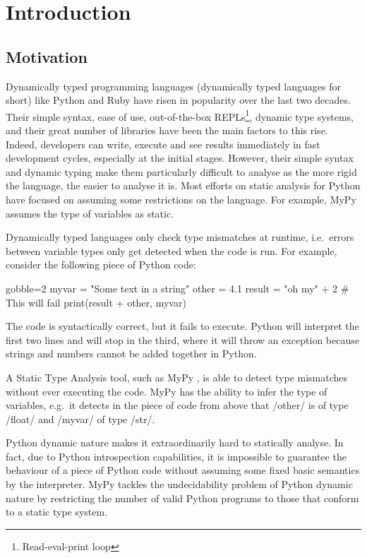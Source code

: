 \chapter{Introduction}\label{introduction}

\section{Motivation}\label{motivation}

Dynamically typed programming languages (dynamically typed languages for short) like
Python and Ruby have risen in popularity over the last two decades. Their simple syntax,
ease of use, out-of-the-box REPLs\footnote{Read-eval-print loop}, dynamic type systems,
and their great number of libraries have been the main factors to this rise. Indeed,
developers can  write, execute and see results immediately in fast development cycles,
especially at the initial stages. However, their simple syntax and dynamic typing make
them particularly difficult to analyse as the more rigid the language, the easier to
analyse it is. Most efforts on static analysis for Python have focused on assuming some
restrictions on the language. For example, MyPy \autocite{lehtosalo2016mypy} assumes the
type of variables as static.

Dynamically typed languages only check type mismatches at runtime, i.e.~errors between
variable types only get detected when the code is run. For example,
consider the following piece of Python code:

\begin{pythoncode*}{gobble=2}
  myvar = "Some text in a string"
  other = 4.1
  result = "oh my" + 2  # This will fail
  print(result + other, myvar)
\end{pythoncode*}

The code is syntactically correct, but it fails to execute. Python will interpret the first
two lines and will stop in the third, where it will throw an exception because strings
and numbers cannot be added together in Python.

A Static Type Analysis tool, such as MyPy \autocite{lehtosalo2016mypy}, is able to detect
type mismatches without ever executing the code.  MyPy has the ability to infer the type
of variables, e.g.~it detects in the piece of code from above that \pycode/other/ is of type
\pycode/float/ and \pycode/myvar/ of type \pycode/str/.

Python dynamic nature makes it extraordinarily hard to statically analyse. In fact,
due to Python introspection capabilities, it is impossible to guarantee the behaviour of a
piece of Python code without assuming some fixed basic semantics by the interpreter.  MyPy
tackles the undecidability problem of Python dynamic nature by restricting the number
of valid Python programs to those that conform to a static type system\footnotemark.

